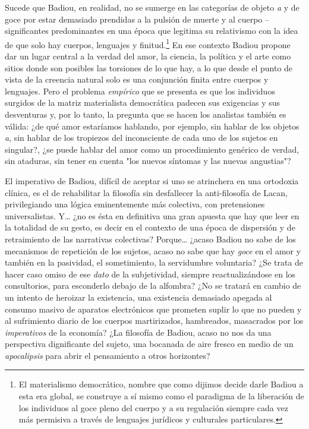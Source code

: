 \documentclass{book}
\begin{document}
Sucede que Badiou, en realidad, no se sumerge en las categorías de
objeto \emph{a} y de goce por estar demasiado prendidas a la pulsión de
muerte y al cuerpo --significantes predominantes en una época que
legitima su relativismo con la idea de que solo hay cuerpos, lenguajes y
finitud.\footnote{El materialismo democrático, nombre que como dijimos
  decide darle Badiou a esta era global, se construye a sí mismo como el
  paradigma de la liberación de los individuos al goce pleno del cuerpo
  y a su regulación siempre cada vez más permisiva a través de lenguajes
  jurídicos y culturales particulares.} En ese contexto Badiou propone
dar un lugar central a la verdad del amor, la ciencia, la política y el
arte como sitios donde son posibles las torsiones de lo que hay, a lo
que desde el punto de vista de la creencia natural solo es una
conjunción finita entre cuerpos y lenguajes. Pero el problema
\emph{empírico} que se presenta es que los individuos surgidos de la
matriz materialista democrática padecen sus exigencias y sus desventuras
y, por lo tanto, la pregunta que se hacen los analistas también es
válida: ¿de qué amor estaríamos hablando, por ejemplo, sin hablar de los
objetos \emph{a}, sin hablar de los tropiezos del inconsciente de cada
uno de los sujetos en singular?, ¿se puede hablar del amor como un
procedimiento genérico de verdad, sin ataduras, sin tener en cuenta "los
nuevos síntomas y las nuevas angustias"?

El imperativo de Badiou, difícil de aceptar si uno se atrinchera en una
ortodoxia clínica, es el de rehabilitar la filosofía sin desfallecer la
anti-filosofía de Lacan, privilegiando una lógica eminentemente más
colectiva, con pretensiones universalistas. Y\ldots{} ¿no es ésta en
definitiva una gran apuesta que hay que leer en la totalidad de su
gesto, es decir en el contexto de una época de dispersión y de
retraimiento de las narrativas colectivas? Porque\ldots{} ¿acaso Badiou
no sabe de los mecanismos de repetición de los sujetos, acaso no sabe
que hay \emph{goce} en el amor y también en la pasividad, el
sometimiento, la servidumbre voluntaria? ¿Se trata de hacer caso omiso
de ese \emph{dato} de la subjetividad, siempre reactualizándose en los
consultorios, para esconderlo debajo de la alfombra? ¿No se tratará en
cambio de un intento de heroizar la existencia, una existencia demasiado
apegada al consumo masivo de aparatos electrónicos que prometen suplir
lo que no pueden y al sufrimiento diario de los cuerpos martirizados,
hambreados, masacrados por los \emph{imperativos} de la economía? ¿La
filosofía de Badiou, acaso no nos da una perspectiva dignificante del
sujeto, una bocanada de aire fresco en medio de un \emph{apocalipsis}
para abrir el pensamiento a otros horizontes?
\end{document}
